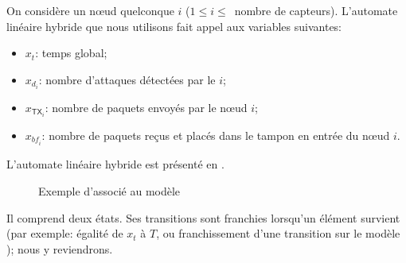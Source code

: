 On considère un nœud quelconque $i$ ($1\leq i\leq$~nombre de capteurs).
L'automate linéaire hybride que nous utilisons fait appel aux variables suivantes:
\begin{itemize}
    \item $x_t$: temps global;
    \item $x_{d_i}$: nombre d'attaques détectées par le \cn $i$;
    \item $x_{\mathsf{TX}_i}$: nombre de paquets envoyés par le nœud $i$;
    \item $x_{\mathit{bf}_i}$: nombre de paquets reçus et placés dans le tampon en entrée du nœud $i$.
\end{itemize}
L'automate linéaire hybride est présenté en .
\begin{figure}[!ht]
    \centering
    \caption{Exemple d'\alh associé au modèle \rpsge}\label{sa:fig:lha}
\end{figure}
Il comprend deux états.
Ses transitions sont franchies lorsqu'un élément survient (par exemple: égalité de $x_t$ à $T$, ou franchissement d'une transition sur le modèle \rpsge); nous y reviendrons.
